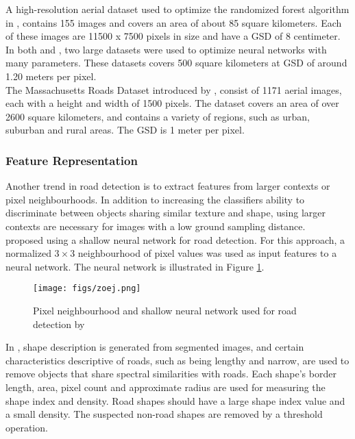 A high-resolution aerial dataset used to optimize the randomized forest algorithm in \citep{Kluckner_semantic_height}, contains  155 images and covers an area of about 85 square kilometers. Each of these images are 11500 x 7500 pixels in size and have a \ac{GSD} of 8 centimeter.\\

In both \citep{Mnih_roads_high_res_aerial_images} and \citep{Mnih_aerial_images_noisy}, two large datasets were used to optimize neural networks with many parameters. These datasets covers 500 square kilometers at \ac{GSD} of around 1.20 meters per pixel.\\

The Massachusetts Roads Dataset introduced by \cite{MnihThesis}, consist of 1171 aerial images, each with a height and width of 1500 pixels. The dataset covers an area of over 2600 square kilometers, and contains a variety of regions, such as urban, suburban and rural areas. The \ac{GSD} is 1 meter per pixel.\\


\subsubsection{Feature Representation}
Another trend in road detection is to extract features from larger contexts or pixel neighbourhoods. In addition to increasing the classifiers ability to discriminate between objects sharing similar texture and shape, using larger contexts are necessary for images with a low ground sampling distance.\\

\cite{Mokhtarzade_road_ann} proposed using a shallow neural network for road detection. For this approach, a normalized $3 \times 3$ neighbourhood of pixel values was used as input features to a neural network. The neural network is illustrated in Figure \ref{fig:zoej_neural_network}. \\

\begin{figure}
\begin{center}
\texttt{[image: figs/zoej.png]}
\caption[shallow neural network]{Pixel neighbourhood and shallow neural network used for road detection by \cite{Mokhtarzade_road_ann} }
\label{fig:zoej_neural_network}
\end{center}
\end{figure}

In \cite{Song_road_extraction_svm}, shape description is generated from segmented images, and certain characteristics descriptive of roads, such as being lengthy and narrow, are used to remove objects that share spectral similarities with roads. Each shape's border length, area, pixel count and approximate radius are used for measuring the shape index and density. Road shapes should have a large shape index value and a small density. The suspected non-road shapes are removed by a threshold operation. \\

